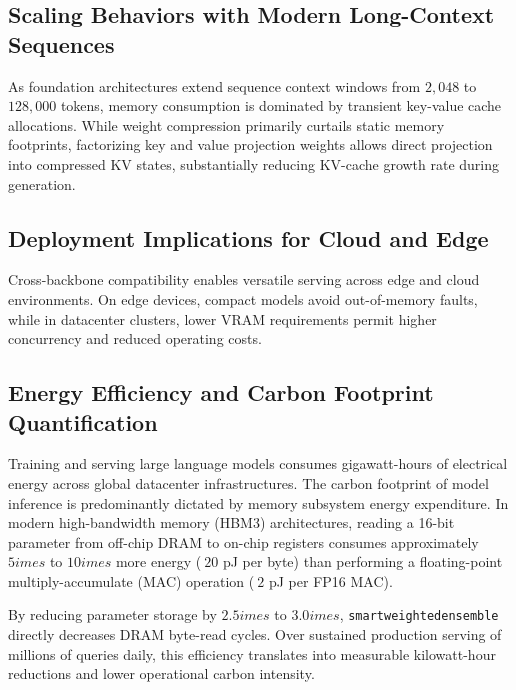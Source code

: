 \subsection{Scaling Behaviors with Modern Long-Context Sequences}
As foundation architectures extend sequence context windows from $2{,}048$ to $128{,}000$ tokens, memory consumption is dominated by transient key-value cache allocations. While weight compression primarily curtails static memory footprints, factorizing key and value projection weights allows direct projection into compressed KV states, substantially reducing KV-cache growth rate during generation.

\subsection{Deployment Implications for Cloud and Edge}
Cross-backbone compatibility enables versatile serving across edge and cloud environments. On edge devices, compact models avoid out-of-memory faults, while in datacenter clusters, lower VRAM requirements permit higher concurrency and reduced operating costs.

\subsection{Energy Efficiency and Carbon Footprint Quantification}
Training and serving large language models consumes gigawatt-hours of electrical energy across global datacenter infrastructures. The carbon footprint of model inference is predominantly dictated by memory subsystem energy expenditure. In modern high-bandwidth memory (HBM3) architectures, reading a 16-bit parameter from off-chip DRAM to on-chip registers consumes approximately $5	imes$ to $10	imes$ more energy ($~20$ pJ per byte) than performing a floating-point multiply-accumulate (MAC) operation ($~2$ pJ per FP16 MAC).

By reducing parameter storage by $2.5	imes$ to $3.0	imes$, \texttt{smartweightedensemble} directly decreases DRAM byte-read cycles. Over sustained production serving of millions of queries daily, this efficiency translates into measurable kilowatt-hour reductions and lower operational carbon intensity.
